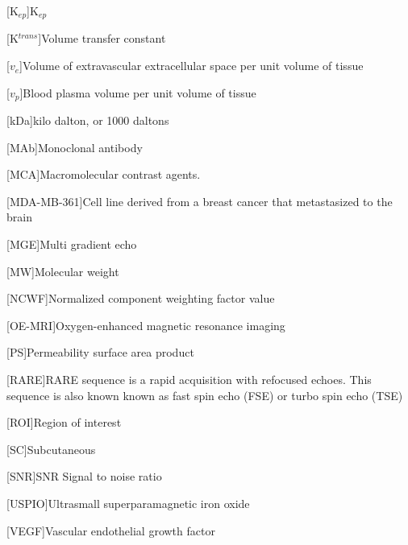 \begin{acronym}
[K$_{ep}$]{K$_{ep}$}

[K$^{trans}$]{Volume transfer constant}

[$v_e$]{Volume of extravascular extracellular space per unit volume of tissue}

[$v_p$]{Blood plasma volume per unit volume of tissue}

[kDa]{kilo dalton, or 1000 daltons}

[MAb]{Monoclonal antibody}

[MCA]{Macromolecular contrast agents.}

[MDA-MB-361]{Cell line derived from a breast cancer that metastasized to the brain}

[MGE]{Multi gradient echo}

[MW]{Molecular weight}

[NCWF]{Normalized component weighting factor value}

[OE-MRI]{Oxygen-enhanced magnetic resonance imaging}

[PS]{Permeability surface area product}

[RARE]{RARE sequence is a rapid acquisition with refocused echoes. This sequence is also known known as fast spin echo (FSE) or turbo spin echo (TSE)}

[ROI]{Region of interest}

[SC]{Subcutaneous}

[SNR]{SNR Signal to noise ratio}

[USPIO]{Ultrasmall superparamagnetic iron oxide}

[VEGF]{Vascular endothelial growth factor}


\end{acronym}

% 
